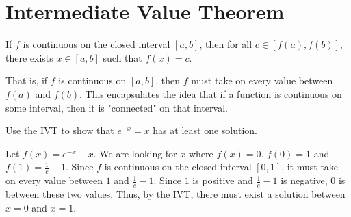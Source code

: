 \section{Intermediate Value Theorem}
\begin{theorem}
	If $f$ is continuous on the closed interval $[a,b]$, then for all $c \in [f(a), f(b)]$, there exists $x \in [a,b]$ such that $f(x) = c$.
\end{theorem}

That is, if $f$ is continuous on $[a,b]$, then $f$ must take on every value between $f(a)$ and $f(b)$.
This encapsulates the idea that if a function is continuous on some interval, then it is "connected" on that interval.

\begin{example}
	Use the IVT to show that $e^{-x} = x$ has at least one solution.
\end{example}
\begin{answer}
	Let $f(x) = e^{-x} - x$.
	We are looking for $x$ where $f(x) = 0$.
	$f(0) = 1$ and $f(1) = \frac{1}{e} - 1$.
	Since $f$ is continuous on the closed interval $[0,1]$, it must take on every value between $1$ and $\frac{1}{e} - 1$.
	Since $1$ is positive and $\frac{1}{e} - 1$ is negative, 0 is between these two values.
	Thus, by the IVT, there must exist a solution between $x=0$ and $x=1$.
\end{answer}
